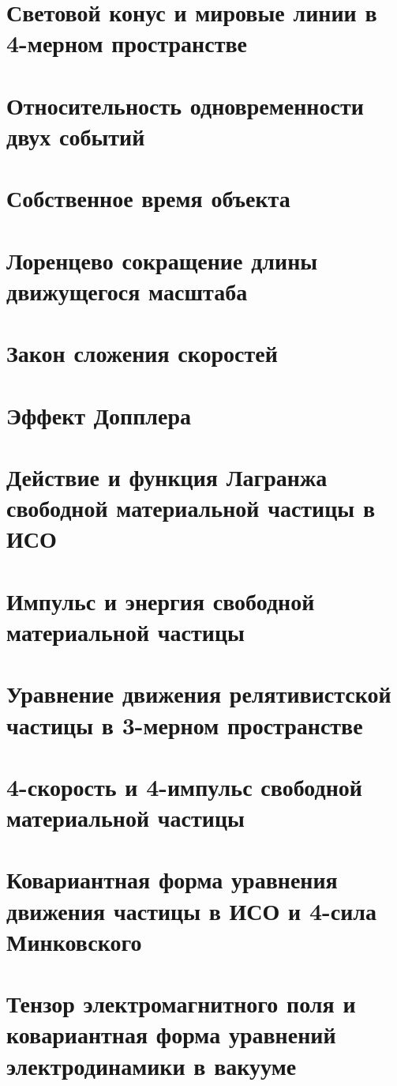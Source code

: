 \begin{multicols*}{5}
		\section{Световой конус и мировые линии в 4-мерном пространстве}
		\section{Относительность одновременности двух событий}
		\section{Собственное время объекта}
		\section{Лоренцево сокращение длины движущегося масштаба}
		\section{Закон сложения скоростей}
		\section{Эффект Допплера}
		\section{Действие и функция Лагранжа свободной материальной частицы в ИСО}
		\section{Импульс и энергия свободной материальной частицы}
		\section{Уравнение движения релятивистской частицы в 3-мерном пространстве}
		\section{4-скорость и 4-импульс свободной материальной частицы}
		\section{Ковариантная форма уравнения движения частицы в ИСО и 4-сила Минковского}
		\section{Тензор электромагнитного поля и ковариантная форма уравнений электродинамики в вакууме}

\end{multicols*}
